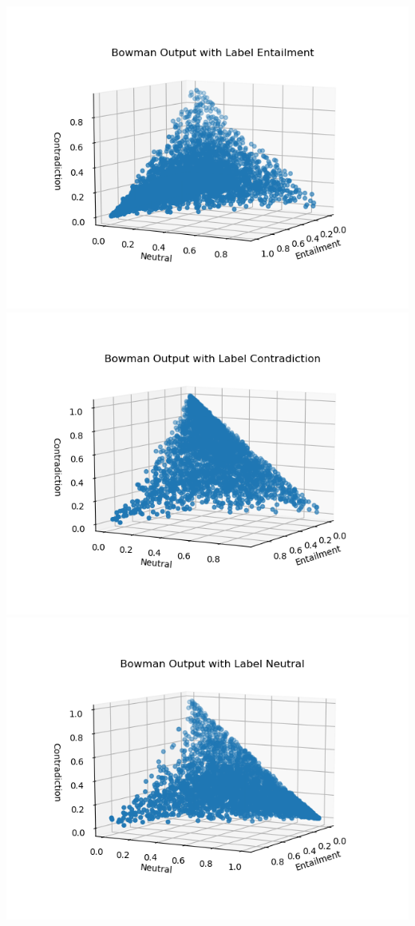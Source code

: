\documentclass[12pt,letterpaper]{article}
\begin{document}
\includegraphics[scale=0.55]{bowmanEntailment.png}
\includegraphics[scale=0.55]{bowmanContradiction.png}\\
\includegraphics[scale=0.55]{bowmanNeutral.png}
\end{document}
